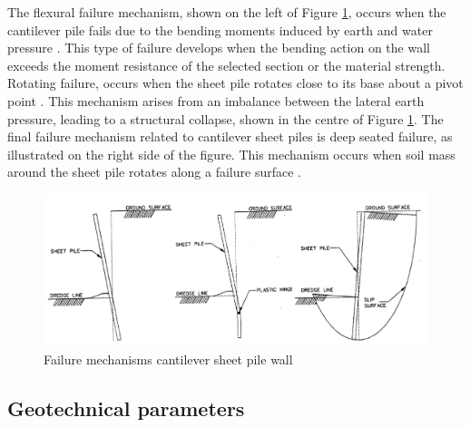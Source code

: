 The flexural failure mechanism, shown on the left of Figure \ref{fig:failure_mechanisms_sheetpiles}, occurs when the cantilever pile fails due to the bending moments induced by earth and water pressure \autocite{brownDesignSheetPile1994}. This type of failure develops when the bending action on the wall exceeds the moment resistance of the selected section or the material strength. Rotating failure, occurs when the sheet pile rotates close to its base about a pivot point \autocite{brownDesignSheetPile1994}. This mechanism arises from an imbalance between the lateral earth pressure, leading to a structural collapse, shown in the centre of Figure \ref{fig:failure_mechanisms_sheetpiles}. The final failure mechanism related to cantilever sheet piles is deep seated failure, as illustrated on the right side of the figure. This mechanism occurs when soil mass around the sheet pile rotates along a failure surface \autocite{brownDesignSheetPile1994}.

\begin{figure}[H]
    \centering
    \includegraphics[width=0.90\linewidth]{figures/ch8/failure_mechanisms.png}
    \caption{Failure mechanisms cantilever sheet pile wall \autocite{brownDesignSheetPile1994}}
    \label{fig:failure_mechanisms_sheetpiles}
\end{figure}


\subsection{Geotechnical parameters}
\label{section:geotechnical_parameters}

